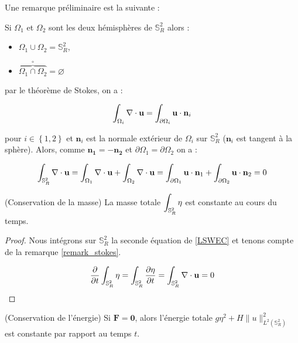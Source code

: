 \begin{remarque}
\label{remark_stokes}
Une remarque préliminaire est la suivante  :

Si $\Omega_1$ et $\Omega_2$ sont les deux hémisphères de $\mathbb{S}^2_R$ alors :
\begin{itemize}
\item $\Omega_1 \cup \Omega_2 = \mathbb{S}^2_R $,
\item $\overbrace{\Omega_1 \cap \Omega_2}^{\circ} = \varnothing$
\end{itemize}

par le théorème de Stokes, on a :

\begin{equation}
\displaystyle\int_{\Omega_i}  \nabla \cdot \mathbf{u} = \displaystyle\int_{\partial \Omega_i} \mathbf{u} \cdot \mathbf{n}_i
\end{equation}

pour $i \in \left\lbrace 1, 2 \right\rbrace$ et $\mathbf{n}_i$ est la normale extérieur de $\Omega_i$ sur $\mathbb{S}_R^2$ ($\mathbf{n}_i$ est tangent à la sphère).
Alors, comme $\mathbf{n_1} = -\mathbf{n_2}$ et $\partial \Omega_1 = \partial \Omega_2$ on a :

$$\displaystyle\int_{\mathbb{S}_R^2}  \nabla \cdot \mathbf{u} = \displaystyle\int_{\Omega_1}  \nabla \cdot \mathbf{u} + \displaystyle\int_{\Omega_2}  \nabla \cdot \mathbf{u} = \displaystyle\int_{\partial \Omega_1} \mathbf{u} \cdot \mathbf{n}_1 + \displaystyle\int_{\partial \Omega_2} \mathbf{u} \cdot \mathbf{n}_2 = 0$$
\end{remarque}

\begin{proposition}
(Conservation de la masse)
La masse totale $\displaystyle\int_{\mathbb{S}_R^2} \eta$ est constante au cours du temps.
\end{proposition}

\begin{proof}
Nous intégrons sur $\mathbb{S}_R^2$ la seconde équation de \eqref{LSWEC} et tenons compte de la remarque \ref{remark_stokes}.

$$\dfrac{\partial}{\partial t} \displaystyle\int_{\mathbb{S}_R^2} \eta = \displaystyle\int_{\mathbb{S}_R^2} \dfrac{\partial \eta}{\partial t} = \displaystyle\int_{\mathbb{S}_R^2} \nabla \cdot \mathbf{u} = 0$$
\end{proof}

\begin{proposition}
(Conservation de l'énergie)
Si $\mathbf{F} = \mathbf{0}$, alors l'énergie totale $g  \eta^2 + H \| u \|_{L^2(\mathbb{S}_R^2)}^2$ est constante par rapport au temps $t$.
\end{proposition}

